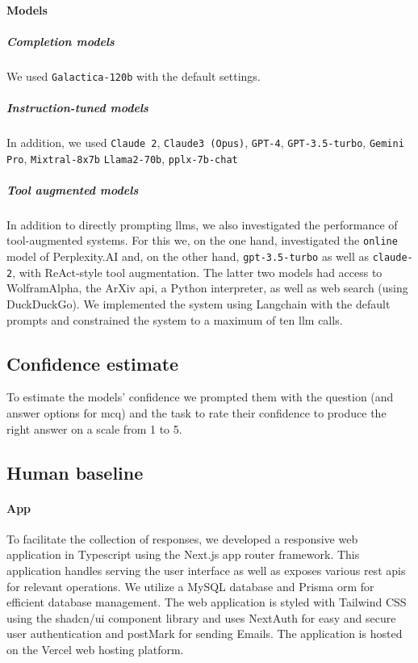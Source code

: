 \documentclass[11pt, oneside]{article}
\begin{document}
\begin{refsection}
\paragraph{Models}
\subparagraph{Completion models}
We used \texttt{Galactica-120b}\autocite{taylor2022galactica} with the default settings.


\subparagraph{Instruction-tuned models} In addition, we used \texttt{Claude 2}, \texttt{Claude3 (Opus)},\autocite{anthropicClaudeModelFamily2024} \texttt{GPT-4},\autocite{openai2024gpt4} \texttt{GPT-3.5-turbo},\autocite{brown2020language}
\texttt{Gemini Pro},\autocite{gemini}
\texttt{Mixtral-8x7b}\autocite{jiang2024mixtral}
\texttt{Llama2-70b},\autocite{touvron2023llama}
\texttt{pplx-7b-chat}

\subparagraph{Tool augmented models}
In addition to directly prompting \glspl{llm}, we also investigated the performance of tool-augmented systems.
For this we, on the one hand, investigated the \texttt{online} model of Perplexity.AI and, on the other hand, \texttt{gpt-3.5-turbo} as well as \texttt{claude-2}, with ReAct-style tool augmentation.\autocite{yao2023react}
The latter two models had access to WolframAlpha, the ArXiv \gls{api}, a Python interpreter, as well as web search (using DuckDuckGo).
We implemented the system using Langchain with the default prompts and constrained the system to a maximum of ten \gls{llm} calls.


\subsection{Confidence estimate}
To estimate the models' confidence we prompted them with the question (and answer options for \gls{mcq}) and the task to rate their confidence to produce the right answer on a scale from 1 to 5. 

\subsection{Human baseline}

\paragraph{App} To facilitate the collection of responses, we developed a responsive web application in Typescript using the Next.js\autocite{nextjs} app router framework.
This application handles serving the user interface as well as exposes various \gls{rest} \glspl{api} for relevant operations.
We utilize a MySQL\autocite{mysql} database and Prisma \gls{orm}\autocite{prisma} for efficient database management.
The web application is styled with Tailwind CSS\autocite{tailwindcss} using the shadcn/ui component library and uses NextAuth\autocite{nextauth} for easy and secure user authentication and postMark for sending Emails.
The application is hosted on the Vercel web hosting platform.


\end{refsection}
\end{document}
